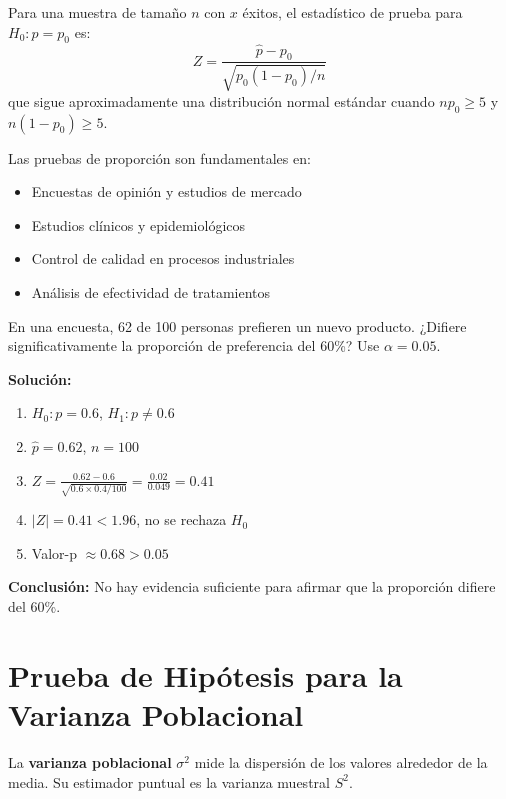 \begin{theorem}
Para una muestra de tamaño $n$ con $x$ éxitos, el estadístico de prueba para $H_0: p = p_0$ es:
\[
Z = \frac{\hat{p} - p_0}{\sqrt{p_0(1-p_0)/n}}
\]
que sigue aproximadamente una distribución normal estándar cuando $np_0 \geq 5$ y $n(1-p_0) \geq 5$.
\end{theorem}

\begin{remark}
Las pruebas de proporción son fundamentales en:
\begin{itemize}
    \item Encuestas de opinión y estudios de mercado
    \item Estudios clínicos y epidemiológicos
    \item Control de calidad en procesos industriales
    \item Análisis de efectividad de tratamientos
\end{itemize}
\end{remark}

\begin{example}
En una encuesta, 62 de 100 personas prefieren un nuevo producto. ¿Difiere significativamente la proporción de preferencia del 60\%? Use $\alpha = 0.05$.

\textbf{Solución:}
\begin{enumerate}
    \item $H_0: p = 0.6$, $H_1: p \neq 0.6$
    \item $\hat{p} = 0.62$, $n = 100$
    \item $Z = \frac{0.62 - 0.6}{\sqrt{0.6 \times 0.4/100}} = \frac{0.02}{0.049} = 0.41$
    \item $|Z| = 0.41 < 1.96$, no se rechaza $H_0$
    \item Valor-p $\approx 0.68 > 0.05$
\end{enumerate}
\textbf{Conclusión:} No hay evidencia suficiente para afirmar que la proporción difiere del 60\%.
\end{example}

\section{Prueba de Hipótesis para la Varianza Poblacional}

\begin{definition}
La \textbf{varianza poblacional} $\sigma^2$ mide la dispersión de los valores alrededor de la media. Su estimador puntual es la varianza muestral $S^2$.
\end{definition}

